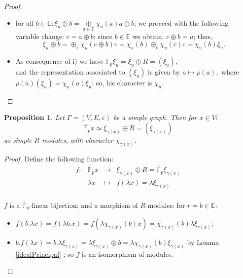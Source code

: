 \documentclass[preprint,12pt,authoryear]{elsarticle}
\newtheorem{prop}[thm]{Proposition}
\theoremstyle{definition}
\begin{document}
\begin{proof}\mbox{}
\begin{itemize}
\item[i)]  for all $b \in \mathbb{E}:\xi_u \oplus b=\underset{a \in \mathbb{E}}{\oplus}\chi_u(a)a\oplus b$; we proceed with the following variable change: $c=a\oplus b$;
since $b \in \mathbb{E}$ we obtain: $c\oplus b= a$; thus, 
\[
\xi_u\oplus b=\oplus_{c} \chi_u(c\oplus b)c=\chi_u(b) \oplus_c\chi_u(c) c=\chi_u(b)\xi_u.
\]
\item[ii)]  As consequence of i) we have $\overline{\mathbb{F}}_p\xi_u= \xi_u \oplus R= (\xi_u)$,\\
and the representation associated to $(\xi_u)$ is given by $a \longmapsto \rho(a),$ 
where $\rho(a)(\xi_u)= \chi_u(a)\xi_u$; so, his character is $\chi_u$.\qedhere
\end{itemize}
 \end{proof}




\begin{prop}
Let $\Gamma =(V, E, \varepsilon)$ be a simple graph. Then for $x \in V:$
\[
\overline{\mathbb{F}}_px \simeq \xi_{\gamma(x)} \oplus R= \left( \xi_{\gamma(x)}\right)
\]
as simple $R$-modules, with character $\chi_{\gamma(x)}$.
\end{prop}

\begin{proof} Define the following function:
$$
\begin{array}{cccl}
f : &  \overline{\mathbb{F}}_px& \longrightarrow &  \xi_{\gamma(x)}\oplus R=  \overline{\mathbb{F}}_p\xi_{\gamma(x)} \\
  & \lambda x & \longmapsto& f(\lambda x)= \lambda \xi_{\gamma(x)}  \\
\end{array}
$$

$f$ is a $\overline{\mathbb{F}}_p$-linear bijection; and a morphism of $R$-modules: for $r=b \in \mathbb{E}$:
\begin{itemize}
\item[-] $f(b. \lambda x)=f(\lambda b .x)= f(\lambda \chi_{\gamma(x)}(b) x)=\chi_{\gamma(x)}(b)\lambda \xi_{\gamma(x)}$;
\item[-] $b.f(\lambda x)=b. \lambda \xi_{\gamma(x)}=\lambda \xi_{\gamma(x)}\oplus b =\lambda\chi_{\gamma(x)}(b)\xi_{\gamma(x)}$ by  Lemma \ref{idealPrincipal} ; so $f$ is an isomorphism of modules.\qedhere
\end{itemize}
\end{proof}
\end{document}
